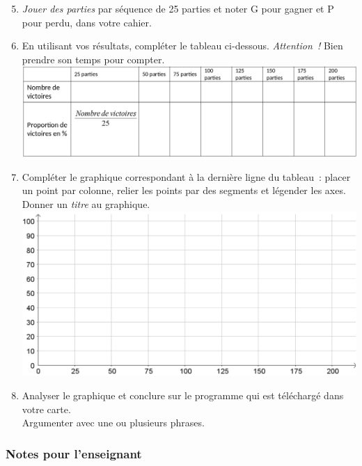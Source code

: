 \begin{eleve}
    \begin{enumerate}
        \setcounter{enumi}{4}
        \item \emph{Jouer des parties} par séquence de 25 parties et noter G pour gagner et P pour perdu, dans votre cahier.
        \item En utilisant vos résultats, compléter le tableau ci-dessous. \emph{Attention !} Bien prendre son temps pour compter.\\
        \includegraphics[width=\linewidth]{res/mb-truque-activite2.png}
        \item Compléter le graphique correspondant à la dernière ligne du tableau : placer un point par colonne, relier les points par des segments et légender les axes.\\
        Donner un \emph{titre} au graphique.\\
          \includegraphics[width=0.8\linewidth]{res/mb-truque-activite3.png}
        \item Analyser le graphique et conclure sur le programme qui est téléchargé dans votre carte.\\
        Argumenter avec une ou plusieurs phrases.
    \end{enumerate}
    
\end{eleve}



\subsubsection{Notes pour l'enseignant}

